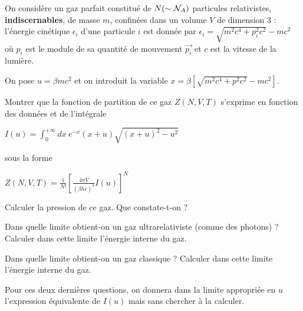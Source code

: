 On considère un gaz parfait constitué de $N (\sim {\cal N}_A)$ particules relativistes, {\bf indiscernables}, de masse $m$, confinées dans un volume $V$ de dimension 3 : l'énergie cinétique $\epsilon_i$ d'une particule $i$ est donnée par \mbox{$\epsilon_i= \sqrt{m^2c^4+p_i^2c^2}-mc^2$} où  $p_i$ est le module de sa quantité de mouvement $\Vec{p_i}$ et $c$ est la vitesse de la lumière.

On pose $u=\beta mc^2$ et on introduit la variable $x=\beta [\sqrt{m^2c^4+p^2c^2}-mc^2]$.

\question Montrer que la fonction de partition de ce gaz $Z(N,V,T)$ s'exprime en fonction des données et de l'intégrale 
\begin{center}
    $ I(u)=\int_0^{+\infty} dx \ e^{-x}(x+u)\sqrt{(x+u)^2-u^2}$
\end{center}
sous la forme
\begin{center}
    $ Z(N,V,T)=\frac{1}{N!}\left[ \frac{4\pi V}{(\beta h c)^3}I(u) \right]^N$
\end{center}

\question Calculer la pression de ce gaz. Que constate-t-on ?

\question Dans quelle limite obtient-on un gaz ultrarelativiste (comme des photons) ? Calculer dans cette limite l'énergie interne du gaz.

\question Dans quelle limite obtient-on un gaz \og classique \fg ? Calculer dans cette limite l'énergie interne du gaz.

Pour ces deux dernières questions, on donnera dans la limite appropriée en $u$ l'expression équivalente de $I(u)$  mais sans chercher à la calculer.